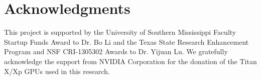 \documentclass[times, 10pt,twocolumn]{article}
\begin{document}



\section*{Acknowledgments}
This project is supported by the University of Southern Mississippi Faculty Startup Funds Award to Dr. Bo Li and the Texas State Research Enhancement Program and  NSF CRI-1305302 Awards to Dr. Yijuan Lu. We gratefully acknowledge the support from NVIDIA Corporation for the donation of the Titan X/Xp GPUs used in this research. %


\end{document}
